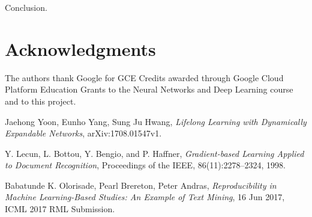 \documentclass[12pt]{article}
\begin{document}
    Conclusion.

    \section{Acknowledgments}

    The authors thank Google for GCE Credits awarded through Google Cloud Platform Education Grants
    to the Neural Networks and Deep Learning course and to this project.    
        
    \begin{thebibliography}{9}
            Jaehong Yoon, Eunho Yang, Sung Ju Hwang,
            \textit{Lifelong Learning with Dynamically Expandable Networks},
            arXiv:1708.01547v1.

            Y. Lecun, L. Bottou, Y. Bengio, and P. Haffner,
            \textit{Gradient-based Learning Applied to Document Recognition},
            Proceedings of the IEEE, 86(11):2278–2324, 1998.

            Babatunde K. Olorisade, Pearl Brereton, Peter Andras, 
            \textit{Reproducibility in Machine Learning-Based Studies: An Example of Text Mining},
            16 Jun 2017, ICML 2017 RML Submission.
    \end{thebibliography}
    
    
\end{document}
